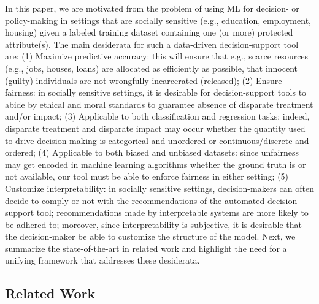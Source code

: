 \documentclass[letterpaper]{article} %
\theoremstyle{definition}
\newcommand{\1}{\ensuremath{{\rm e}}} %
\begin{document}
In this paper, we are motivated from the problem of using ML for decision- or policy-making in settings that are socially sensitive (e.g., education, employment, housing) given a labeled training dataset containing one (or more) protected attribute(s). The main desiderata for such a data-driven decision-support tool are: (1) Maximize predictive accuracy: this will ensure that e.g., scarce resources (e.g., jobs, houses, loans) are allocated as efficiently as possible, that innocent (guilty) individuals are not wrongfully incarcerated (released); (2) Ensure fairness: in socially sensitive settings, it is desirable for decision-support tools to abide by ethical and moral standards to guarantee absence of disparate treatment and/or impact; (3) Applicable to both classification and regression tasks: indeed, disparate treatment and disparate impact may occur whether the quantity used to drive decision-making is categorical and unordered or continuous/discrete and ordered; (4) Applicable to both biased and unbiased datasets: since unfairness may get encoded in machine learning algorithms whether the ground truth is or not available, our tool must be able to enforce fairness in either setting; (5) Customize interpretability: in socially sensitive settings, decision-makers can often decide to comply or not with the recommendations of the automated decision-support tool; recommendations made by interpretable systems are more likely to be adhered to; moreover,  since interpretability is subjective, it is desirable that the decision-maker be able to customize the structure of the model. Next, we summarize the state-of-the-art in related work and highlight the need for a unifying framework that addresses these desiderata.

\subsection{Related Work}
\end{document}
